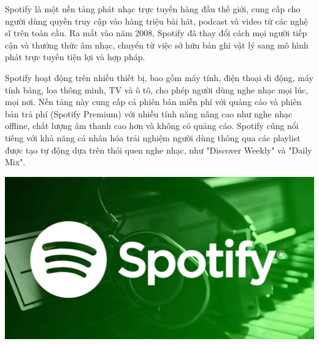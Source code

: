 Spotify là một nền tảng phát nhạc trực tuyến hàng đầu thế giới, cung cấp cho người dùng quyền truy cập vào hàng triệu bài hát, podcast và video từ các nghệ sĩ trên toàn cầu. Ra mắt vào năm 2008, Spotify đã thay đổi cách mọi người tiếp cận và thưởng thức âm nhạc, chuyển từ việc sở hữu bản ghi vật lý sang mô hình phát trực tuyến tiện lợi và hợp pháp.

Spotify hoạt động trên nhiều thiết bị, bao gồm máy tính, điện thoại di động, máy tính bảng, loa thông minh, TV và ô tô, cho phép người dùng nghe nhạc mọi lúc, mọi nơi. Nền tảng này cung cấp cả phiên bản miễn phí với quảng cáo và phiên bản trả phí (Spotify Premium) với nhiều tính năng nâng cao như nghe nhạc offline, chất lượng âm thanh cao hơn và không có quảng cáo. Spotify cũng nổi tiếng với khả năng cá nhân hóa trải nghiệm người dùng thông qua các playlist được tạo tự động dựa trên thói quen nghe nhạc, như "Discover Weekly" và "Daily Mix".

\includegraphics[width=\textwidth]{imgs/spotify.png}